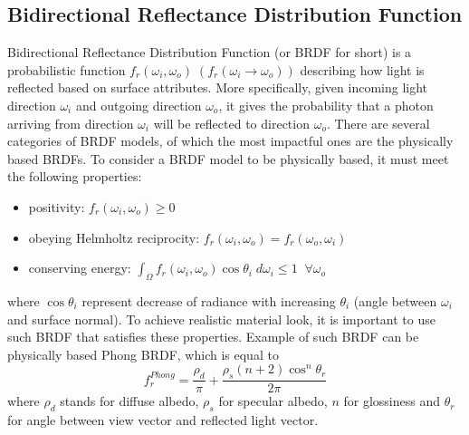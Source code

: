     \subsection{Bidirectional Reflectance Distribution Function}
    Bidirectional Reflectance Distribution Function (or BRDF for short) is a probabilistic function $f_r(\omega_i, \omega_o) \; (f_r(\omega_i \to \omega_o))$ describing how light is reflected based on surface attributes. More specifically, given incoming light direction $\omega_i$ and outgoing direction $\omega_o$, it gives the probability that a photon arriving from direction $\omega_i$ will be reflected to direction $\omega_o$.
    \newline
    There are several categories of BRDF models, of which the most impactful ones are the physically based BRDFs. To consider a BRDF model to be physically based, it must meet the following properties:
    \begin{itemize}
        \item positivity: $f_r(\omega_i, \omega_o) \geq 0$
        \item obeying Helmholtz reciprocity: $f_r(\omega_i,\omega_o) = f_r(\omega_o, \omega_i)$
        \item conserving energy: $\int_{\Omega} f_r(\omega_i, \omega_o) \cos \theta_i \; d\omega_i \leq 1 \;\; \forall \omega_o$
    \end{itemize}
    where $\cos \theta_i$ represent decrease of radiance with increasing $\theta_i$ (angle between $\omega_i$ and surface normal).
    \newline
    To achieve realistic material look, it is important to use such BRDF that satisfies these properties. Example of such BRDF can be physically based Phong BRDF, which is equal to
    \begin{equation}
        f^{Phong}_r = \frac{\rho_d}{\pi} + \frac{\rho_s(n + 2)\cos^n \theta_r}{2\pi}
        \label{eq:phong_correct}
    \end{equation}
    where $\rho_d$ stands for diffuse albedo, $\rho_s$ for specular albedo, $n$ for glossiness and $\theta_r$ for angle between view vector and reflected light vector.
